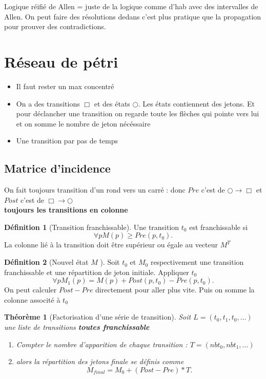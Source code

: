 \documentclass{article}
\theoremstyle{plain}%
\newtheorem{thm}{Théorème}[section]
\theoremstyle{definition}
\newtheorem{defn}{Définition}[section]
\theoremstyle{remark}
\begin{document}
Logique réifié de Allen = juste de la logique comme d'hab avec des intervalles de Allen. On peut faire des résolutions dedans c'est plus pratique que la propagation pour prouver des contradictions.

\section{Réseau de pétri}
\begin{itemize}
    \item Il faut rester un max concentré
    \item On a des transitions $ \Box  $ et des états $ \bigcirc  $. Les états contiennent des jetons. Et pour déclancher une transition on regarde toute les flèches qui pointe vers lui et on somme le nombre de jeton nécéssaire
    \item Une transition par pas de temps 
\end{itemize}

\subsection{Matrice d'incidence}
On fait toujours transition d'un rond vers un carré : donc $ Pre $ c'est de $ \bigcirc \to \Box  $ et $ Post $ c'est de $ \Box \to \bigcirc  $ \\
\textbf{toujours les transitions en colonne} \\
\begin{defn}[Transition franchissable]
    Une transition $ t_0 $  est franchissable si 
    \[
        \forall p M(p) \geq Pre(p, t_0)
    .\]
    La colonne lié à la transition doit être supérieur ou égale au vecteur $ M^T $ 
\end{defn}

\begin{defn}[Nouvel état $ M $ ]
    Soit $ t_0 $ et $ M_0 $ respectivement une transition franchissable et une répartition de jeton initiale. Appliquer $ t_0 $ 
    \[
        \forall p M_1(p) = M(p) + Post(p, t_0) - Pre(p,t_0)
    .\]
    On peut calculer $ Post - Pre $ directement pour aller plus vite. Puis on somme la colonne associté à $ t_0 $ 
\end{defn}

\begin{thm}[Factorisation d'une série de transition]
    Soit $ L = (t_0, t_1, t_0, \dots) $ une liste de transitions \textbf{toutes franchissable} 
    \begin{enumerate}
        \item Compter le nombre d'apparition de chaque transition : $ T = (nbt_0, nbt_1, \dots) $ 
        \item alors la répartition des jetons finale se définis comme 
        \[
            M_{final} = M_0 + (Post - Pre)*T
        .\]
    \end{enumerate}
\end{thm}
\end{document}
